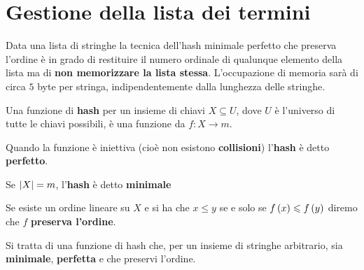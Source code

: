 \documentclass[\main/main.tex]{subfiles}
\begin{document}
\chapter{Gestione della lista dei termini}
\begin{multicols}{2}
\begin{observation}
    Data una lista di stringhe la tecnica dell'hash minimale perfetto che preserva l'ordine è in grado di restituire il numero ordinale di qualunque elemento della lista ma di \textbf{non memorizzare la lista stessa}. L'occupazione di memoria sarà di circa \(5\) byte per stringa, indipendentemente dalla lunghezza delle stringhe.
\end{observation}
\begin{definition}[Hash]
    Una funzione di \textbf{hash} per un insieme di chiavi \(X \subseteq U\), dove \(U\) è l'universo di tutte le chiavi possibili, è una funzione da \(f: X \rightarrow m\).
\end{definition}
\begin{definition}
    Quando la funzione è iniettiva (cioè non esistono \textbf{collisioni}) l'\textbf{hash} è detto \textbf{perfetto}.
\end{definition}
\begin{definition}
    Se \(\left\lvert X\right\rvert = m\), l'\textbf{hash} è detto \textbf{minimale}
\end{definition}
\begin{definition}
    Se esiste un ordine lineare su \(X\) e si ha che \(x \leq y\) se e solo se \(f\left(x\right) \leqslant f\left(y\right)\) diremo che \(f\) \textbf{preserva l'ordine}.
\end{definition}
\begin{definition}
    Si tratta di una funzione di hash che, per un insieme di stringhe arbitrario, sia \textbf{minimale}, \textbf{perfetta} e che preservi l'ordine.
\end{definition}
\end{multicols}
\end{document}
